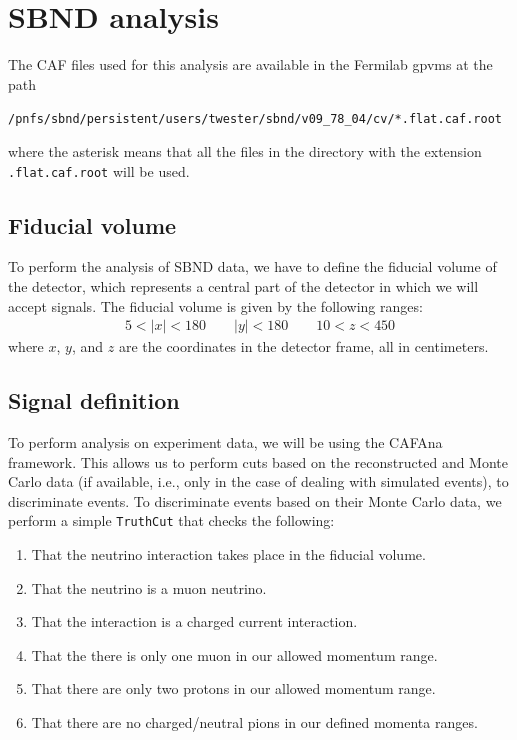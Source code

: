 \documentclass{article}
\begin{document}
\clearpage

\section{SBND analysis}

The CAF files used for this analysis are available in the Fermilab gpvms at the 
path 

\begin{center}
    \verb|/pnfs/sbnd/persistent/users/twester/sbnd/v09_78_04/cv/*.flat.caf.root|
\end{center}

\noindent where the asterisk means that all the files in the directory with the extension 
\verb|.flat.caf.root| will be used.

\subsection{Fiducial volume}

To perform the analysis of SBND data, we have to define the fiducial volume of the detector, which represents
a central part of the detector in which we will accept signals. The fiducial volume is given by the 
following ranges:
\begin{align}
    5 < |x| < 180 \qquad |y| < 180 \qquad 10 < z < 450
\end{align}
where $x$, $y$, and $z$ are the coordinates in the detector frame, all in centimeters.

\subsection{Signal definition}

To perform analysis on experiment data, we will be using the CAFAna framework. This allows us to perform cuts based on the reconstructed and Monte Carlo data (if available, i.e., only in the case of dealing with simulated events), to discriminate events. To discriminate events based on their Monte Carlo data, we perform a simple \verb|TruthCut| that checks the following:
\begin{enumerate}[label=(\roman*)]
    \item That the neutrino interaction takes place in the fiducial volume.
    \item That the neutrino is a muon neutrino.
    \item That the interaction is a charged current interaction.
    \item That the there is only one muon in our allowed momentum range.
    \item That there are only two protons in our allowed momentum range.
    \item That there are no charged/neutral pions in our defined momenta ranges.
\end{enumerate}
\end{document}
